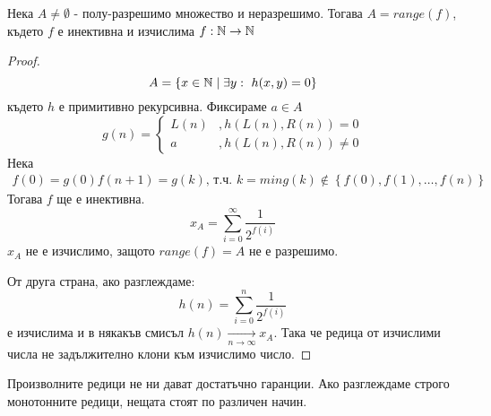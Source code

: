 \begin{proposition}
    Нека $A \neq \emptyset$ - полу-разрешимо множество и неразрешимо. Тогава $A = range(f)$, където $f$ е инективна и изчислима $f: {\mathbb{N}} \to {\mathbb{N}}$
\end{proposition}
\begin{proof}
    \begin{equation*}
        A = \left\{ x \in {\mathbb{N}} \mid \exists y:\ h(x, y) = 0 \right\}
    \end{equation*}
    където $h$ е примитивно рекурсивна. Фиксираме $a \in A$
    \begin{equation*}
        g(n) = \begin{cases}
            L(n)& , h(L(n), R(n)) = 0 \\
            a& , h(L(n), R(n)) \neq 0
        \end{cases}
    \end{equation*}
    Нека 
    \begin{equation*}
        \begin{split}
            f(0) = g(0)
            f(n+1) = g(k)\text{, т.ч. } k = min g(k) \notin \left\{f(0), f(1), \dots, f(n)\right\}
        \end{split}
    \end{equation*}
    Тогава $f$ ще е инективна.
    \begin{equation*}
        x_A = \sum\limits_{i=0}^\infty \frac{1}{2^{f(i)}}
    \end{equation*}
    $x_A$ не е изчислимо, защото $range(f) = A$ не е разрешимо.

    От друга страна, ако разглеждаме:
    \begin{equation*}
        h(n) = \sum\limits_{i=0}^n \frac{1}{2^{f(i)}}
    \end{equation*}
    е изчислима и в някакъв смисъл $h(n) \underset{n \to \infty}{\to} x_A$. Така че редица от изчислими числа не задължително клони към изчислимо число.
\end{proof}
\begin{remark}
    Произволните редици не ни дават достатъчно гаранции. Ако разглеждаме строго монотонните редици, нещата стоят по различен начин.
\end{remark}